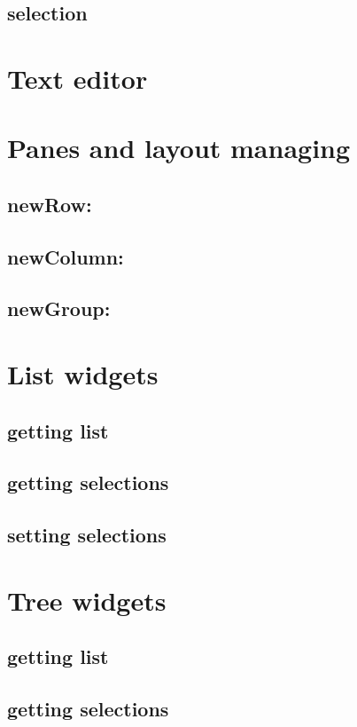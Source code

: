 \documentclass[a4paper,10pt,twoside]{book}
\begin{document}
\subsection{selection}

\section{Text editor}

\section{Panes and layout managing}
\subsection{newRow:}
\subsection{newColumn:}
\subsection{newGroup:}

\section{List widgets}
\subsection{getting list}
\subsection{getting selections}
\subsection{setting selections}


\section{Tree widgets}
\subsection{getting list}
\subsection{getting selections}
\end{document}
